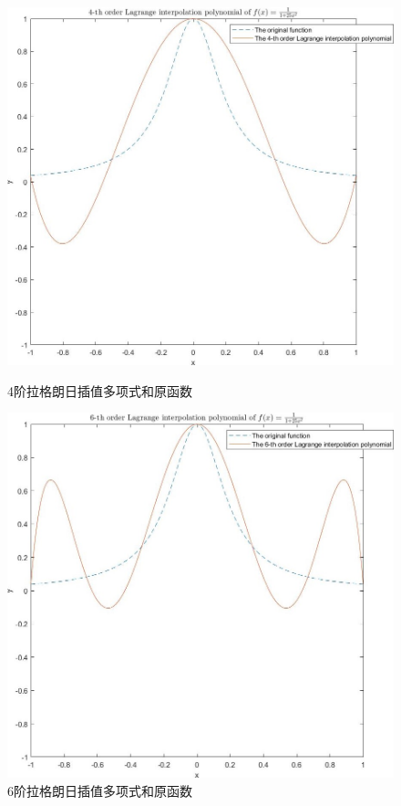 \documentclass[10pt,a4paper]{article}
\begin{document}
\begin{figure}[H]
\centering
\includegraphics[scale=.4]{1_1_2.jpg}
\caption{4阶拉格朗日插值多项式和原函数}
\includegraphics[scale=.4]{1_1_3.jpg}
\caption{6阶拉格朗日插值多项式和原函数}
\end{figure}
\newpage
\end{document}
